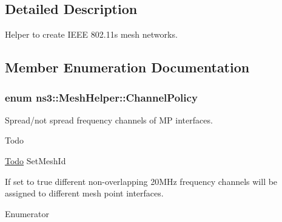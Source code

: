\subsection{Detailed Description}
Helper to create I\+E\+EE 802.\+11s mesh networks. 

\subsection{Member Enumeration Documentation}
\subsubsection[{\texorpdfstring{Channel\+Policy}{ChannelPolicy}}]{\setlength{\rightskip}{0pt plus 5cm}enum {\bf ns3\+::\+Mesh\+Helper\+::\+Channel\+Policy}}\hypertarget{classns3_1_1MeshHelper_ac0e3f8f6ae16a79bb09cc25e5c7b8301}{}\label{classns3_1_1MeshHelper_ac0e3f8f6ae16a79bb09cc25e5c7b8301}


Spread/not spread frequency channels of MP interfaces. 

\begin{DoxyRefDesc}{Todo}
\item[\hyperlink{todo__todo000115}{Todo}]Set\+Mesh\+Id \end{DoxyRefDesc}
If set to true different non-\/overlapping 20\+M\+Hz frequency channels will be assigned to different mesh point interfaces. \begin{Desc}
\item[Enumerator]\par
\begin{description}
\item[{\em 
S\+P\+R\+E\+A\+D\+\_\+\+C\+H\+A\+N\+N\+E\+LS\hypertarget{classns3_1_1MeshHelper_ac0e3f8f6ae16a79bb09cc25e5c7b8301a1519e687a721a277fe0859621129103b}{}\label{classns3_1_1MeshHelper_ac0e3f8f6ae16a79bb09cc25e5c7b8301a1519e687a721a277fe0859621129103b}
}]\item[{\em 
Z\+E\+R\+O\+\_\+\+C\+H\+A\+N\+N\+EL\hypertarget{classns3_1_1MeshHelper_ac0e3f8f6ae16a79bb09cc25e5c7b8301adba490debb025aecf7c894990267c544}{}\label{classns3_1_1MeshHelper_ac0e3f8f6ae16a79bb09cc25e5c7b8301adba490debb025aecf7c894990267c544}
}]\end{description}
\end{Desc}

